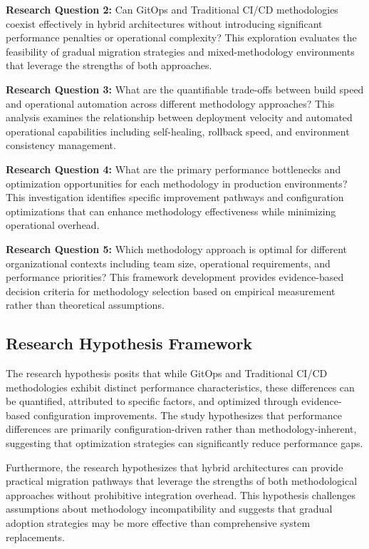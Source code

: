 \textbf{Research Question 2:} Can GitOps and Traditional CI/CD methodologies coexist effectively in hybrid architectures without introducing significant performance penalties or operational complexity? This exploration evaluates the feasibility of gradual migration strategies and mixed-methodology environments that leverage the strengths of both approaches.

\textbf{Research Question 3:} What are the quantifiable trade-offs between build speed and operational automation across different methodology approaches? This analysis examines the relationship between deployment velocity and automated operational capabilities including self-healing, rollback speed, and environment consistency management.

\textbf{Research Question 4:} What are the primary performance bottlenecks and optimization opportunities for each methodology in production environments? This investigation identifies specific improvement pathways and configuration optimizations that can enhance methodology effectiveness while minimizing operational overhead.

\textbf{Research Question 5:} Which methodology approach is optimal for different organizational contexts including team size, operational requirements, and performance priorities? This framework development provides evidence-based decision criteria for methodology selection based on empirical measurement rather than theoretical assumptions.

\subsection{Research Hypothesis Framework}
The research hypothesis posits that while GitOps and Traditional CI/CD methodologies exhibit distinct performance characteristics, these differences can be quantified, attributed to specific factors, and optimized through evidence-based configuration improvements. The study hypothesizes that performance differences are primarily configuration-driven rather than methodology-inherent, suggesting that optimization strategies can significantly reduce performance gaps.

Furthermore, the research hypothesizes that hybrid architectures can provide practical migration pathways that leverage the strengths of both methodological approaches without prohibitive integration overhead. This hypothesis challenges assumptions about methodology incompatibility and suggests that gradual adoption strategies may be more effective than comprehensive system replacements.

